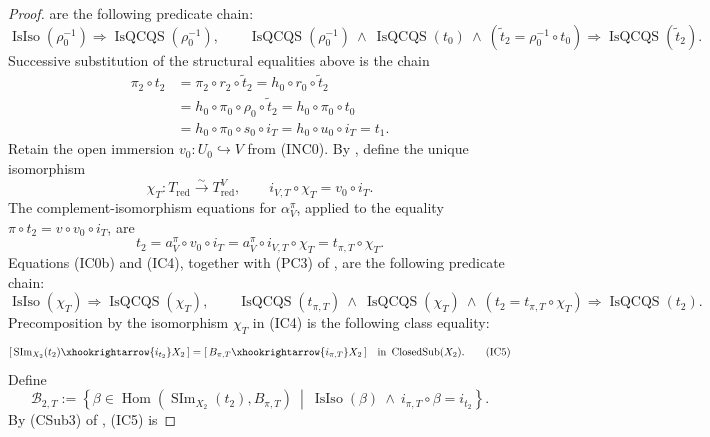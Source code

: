 \begin{proof}
   are the following predicate
  chain:
  \[
    \operatorname{IsIso}(\rho_0^{-1})
      \Longrightarrow\operatorname{IsQCQS}(\rho_0^{-1}),
    \qquad
    \operatorname{IsQCQS}(\rho_0^{-1})\ \wedge\
      \operatorname{IsQCQS}(t_0)\ \wedge\
      (\widetilde t_2=\rho_0^{-1}\circ t_0)
      \Longrightarrow\operatorname{IsQCQS}(\widetilde t_2).       \tag{IC3b}
  \]
  Successive substitution of the structural equalities above is the chain
  \[
  \begin{aligned}
    \pi_2\circ t_2
      &=\pi_2\circ r_2\circ\widetilde t_2
       =h_0\circ r_0\circ\widetilde t_2\\
      &=h_0\circ\pi_0\circ\rho_0\circ\widetilde t_2
       =h_0\circ\pi_0\circ t_0\\
      &=h_0\circ\pi_0\circ s_0\circ i_T
       =h_0\circ u_0\circ i_T=t_1.
  \end{aligned}
  \]
  Retain the open immersion \(v_0\colon U_0\hookrightarrow V\) from (INC0).  By
  , define the unique
  isomorphism
  \[
    \chi_T\colon T_{\mathrm{red}}\xrightarrow{\sim}T_{\mathrm{red}}^V,
    \qquad
    i_{V,T}\circ\chi_T=v_0\circ i_T.                              \tag{IC3}
  \]
  The complement-isomorphism equations for
  \(\alpha_V^\pi\), applied to the equality
  \(\pi\circ t_2=v\circ v_0\circ i_T\), are
  \[
    t_2
      =a_V^\pi\circ v_0\circ i_T
      =a_V^\pi\circ i_{V,T}\circ\chi_T
      =t_{\pi,T}\circ\chi_T.                                     \tag{IC4}
  \]
  Equations (IC0b) and (IC4), together with (PC3) of
  , are the following predicate
  chain:
  \[
    \operatorname{IsIso}(\chi_T)
      \Longrightarrow\operatorname{IsQCQS}(\chi_T),
    \qquad
    \operatorname{IsQCQS}(t_{\pi,T})\ \wedge\
      \operatorname{IsQCQS}(\chi_T)\ \wedge\
      (t_2=t_{\pi,T}\circ\chi_T)
      \Longrightarrow\operatorname{IsQCQS}(t_2).                 \tag{IC4a}
  \]
  Precomposition by the isomorphism \(\chi_T\) in (IC4) is the following
  class equality:
  \[
    [\,\operatorname{SIm}_{X_2}(t_2)\xhookrightarrow{i_{t_2}}X_2\,]
      =[\,B_{\pi,T}\xhookrightarrow{i_{\pi,T}}X_2\,]
      \quad\text{in }\operatorname{ClosedSub}(X_2).              \tag{IC5}
  \]
  Define
  \[
    \mathscr B_{2,T}:=
      \left\{\beta\in
        \operatorname{Hom}(\operatorname{SIm}_{X_2}(t_2),B_{\pi,T})
        \ \middle|\
        \operatorname{IsIso}(\beta)\ \wedge\
        i_{\pi,T}\circ\beta=i_{t_2}\right\}.
  \]
  By (CSub3) of , (IC5) is

\end{proof}
